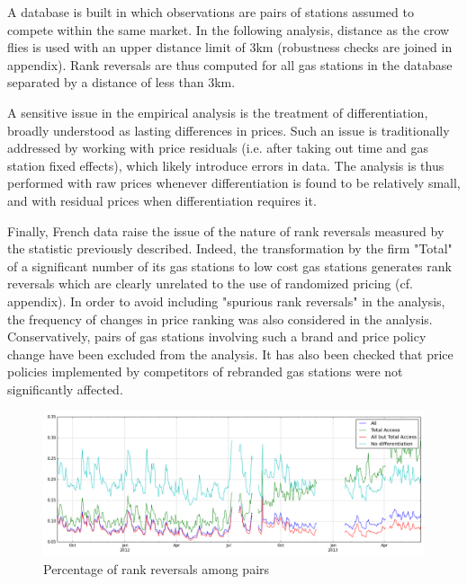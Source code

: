 \documentclass[11pt]{article}
\begin{document}
A database is built in which observations are pairs of stations assumed to compete within the same market. In the following analysis, distance as the crow flies is used with an upper distance limit of 3km (robustness checks are joined in appendix). Rank reversals are thus computed for all gas stations in the database separated by a distance of less than 3km.

A sensitive issue in the empirical analysis is the treatment of differentiation, broadly understood as lasting differences in prices. Such an issue is traditionally addressed by working with price residuals (i.e. after taking out time and gas station fixed effects), which likely introduce errors in data. The analysis is thus performed with raw prices whenever differentiation is found to be relatively small, and with residual prices when differentiation requires it.

Finally, French data raise the issue of the nature of rank reversals measured by the statistic previously described. Indeed, the transformation by the firm "Total" of a significant number of its gas stations to low cost gas stations generates rank reversals which are clearly unrelated to the use of randomized pricing (cf. appendix). In order to avoid including "spurious rank reversals" in the analysis, the frequency of changes in price ranking was also considered in the analysis. Conservatively, pairs of gas stations involving such a brand and price policy change have been excluded from the analysis. It has also been checked that price policies implemented by competitors of rebranded gas stations were not significantly affected.

\begin{figure}[!h]
    \caption{Percentage of rank reversals among pairs}
	\centering
		\includegraphics[width=16cm]{graphs/ecdf_rr_temporal.png}
\end{figure}
\end{document}
